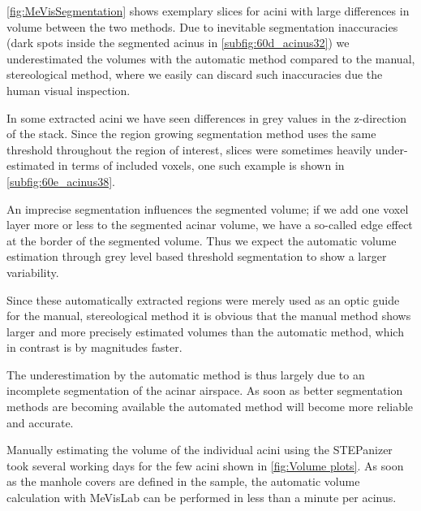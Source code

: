 \documentclass[a4paper,DIV=calc,abstract,english]{scrartcl}
\begin{document}
\autoref{fig:MeVisSegmentation} shows exemplary slices for acini with large differences in volume between the two methods.
Due to inevitable segmentation inaccuracies (dark spots inside the segmented acinus in \autoref{subfig:60d_acinus32}) we underestimated the volumes with the automatic method compared to the manual, stereological method, where we easily can discard such inaccuracies due the human visual inspection.

In some extracted acini we have seen differences in grey values in the z-direction of the stack.
Since the region growing segmentation method uses the same threshold throughout the region of interest, slices were sometimes heavily under-estimated in terms of included voxels, one such example is shown in \autoref{subfig:60e_acinus38}.

An imprecise segmentation influences the segmented volume; if we add one voxel layer more or less to the segmented acinar volume, we have a so-called edge effect at the border of the segmented volume.
Thus we expect the automatic volume estimation through grey level based threshold segmentation to show a larger variability.

Since these automatically extracted regions were merely used as an optic guide for the manual, stereological method it is obvious that the manual method shows larger and more precisely estimated volumes than the automatic method, which in contrast is by magnitudes faster.

The underestimation by the automatic method is thus largely due to an incomplete segmentation of the acinar airspace.
As soon as better segmentation methods are becoming available the automated method will become more reliable and accurate.

Manually estimating the volume of the individual acini using the STEPanizer took several working days for the few acini shown in \autoref{fig:Volume plots}.
As soon as the manhole covers are defined in the sample, the automatic volume calculation with MeVisLab can be performed in less than a minute per acinus.
\end{document}
